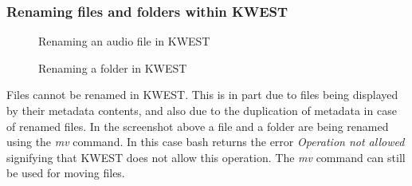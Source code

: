 \subsubsection{Renaming files and folders within KWEST}
\begin{figure}[htb]
\centering
\setlength\fboxsep{0pt}
\setlength\fboxrule{0.5pt}
\caption{Renaming an audio file in KWEST}
\label{fig:dfd0}
\end{figure}

\begin{figure}[htb]
\centering
\setlength\fboxsep{0pt}
\setlength\fboxrule{0.5pt}
\caption{Renaming a folder in KWEST}
\label{fig:dfd0}
\end{figure}
Files cannot be renamed in KWEST. This is in part due to files being displayed by their metadata contents, and also due to the duplication of metadata in case of renamed files. In the screenshot above a file and a folder are being renamed using the \emph{mv} command. In this case bash returns the error \emph{Operation not allowed} signifying that KWEST does not allow this operation. The \emph{mv} command can still be used for moving files.

